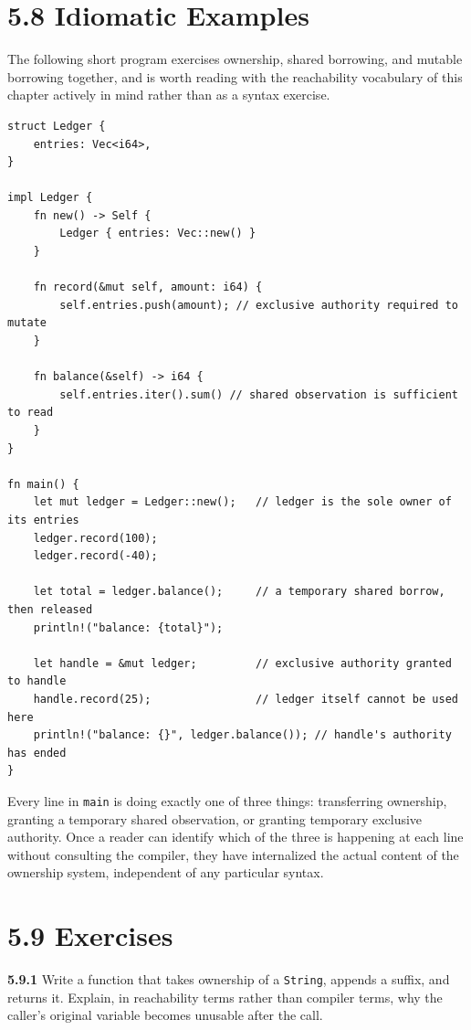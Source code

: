 \documentclass[11pt]{book}
\begin{document}
\section*{5.8 Idiomatic Examples}

The following short program exercises ownership, shared borrowing, and mutable borrowing together, and is worth reading with the reachability vocabulary of this chapter actively in mind rather than as a syntax exercise.

\begin{lstlisting}
struct Ledger {
    entries: Vec<i64>,
}

impl Ledger {
    fn new() -> Self {
        Ledger { entries: Vec::new() }
    }

    fn record(&mut self, amount: i64) {
        self.entries.push(amount); // exclusive authority required to mutate
    }

    fn balance(&self) -> i64 {
        self.entries.iter().sum() // shared observation is sufficient to read
    }
}

fn main() {
    let mut ledger = Ledger::new();   // ledger is the sole owner of its entries
    ledger.record(100);
    ledger.record(-40);

    let total = ledger.balance();     // a temporary shared borrow, then released
    println!("balance: {total}");

    let handle = &mut ledger;         // exclusive authority granted to handle
    handle.record(25);                // ledger itself cannot be used here
    println!("balance: {}", ledger.balance()); // handle's authority has ended
}
\end{lstlisting}

Every line in \texttt{main} is doing exactly one of three things: transferring ownership, granting a temporary shared observation, or granting temporary exclusive authority. Once a reader can identify which of the three is happening at each line without consulting the compiler, they have internalized the actual content of the ownership system, independent of any particular syntax.

\section*{5.9 Exercises}

\noindent\textbf{5.9.1} Write a function that takes ownership of a \texttt{String}, appends a suffix, and returns it. Explain, in reachability terms rather than compiler terms, why the caller's original variable becomes unusable after the call.
\end{document}
